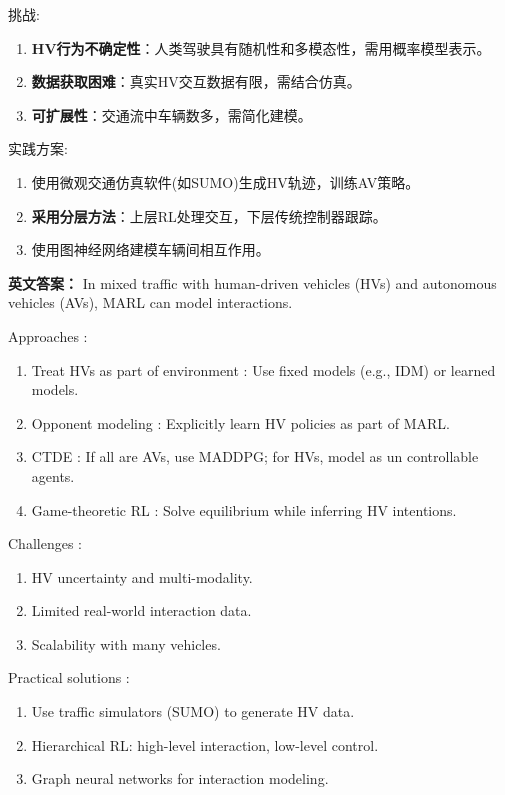 \documentclass[10pt,a4paper]{ctexart}
\begin{document}
 挑战:
\begin{enumerate}
    \item \textbf{HV行为不确定性}：人类驾驶具有随机性和多模态性，需用概率模型表示。
    \item \textbf{数据获取困难}：真实HV交互数据有限，需结合仿真。
    \item \textbf{可扩展性}：交通流中车辆数多，需简化建模。
\end{enumerate}

 实践方案:
\begin{enumerate}
    \item 使用微观交通仿真软件(如SUMO)生成HV轨迹，训练AV策略。
    \item \textbf{采用分层方法}：上层RL处理交互，下层传统控制器跟踪。
    \item 使用图神经网络建模车辆间相互作用。
\end{enumerate}

\textbf{英文答案：}  
In mixed traffic with human-driven vehicles (HVs) and autonomous vehicles (AVs), MARL can model interactions.

 Approaches :
\begin{enumerate}
    \item Treat HVs as part of environment : Use fixed models (e.g., IDM) or learned models.
    \item Opponent modeling : Explicitly learn HV policies as part of MARL.
    \item CTDE : If all are AVs, use MADDPG; for HVs, model as un controllable agents.
    \item Game-theoretic RL : Solve equilibrium while inferring HV intentions.
\end{enumerate}

 Challenges :
\begin{enumerate}
    \item HV uncertainty and multi-modality.
    \item Limited real-world interaction data.
    \item Scalability with many vehicles.
\end{enumerate}

 Practical solutions :
\begin{enumerate}
    \item Use traffic simulators (SUMO) to generate HV data.
    \item Hierarchical RL: high-level interaction, low-level control.
    \item Graph neural networks for interaction modeling.
\end{enumerate}
\end{document}
